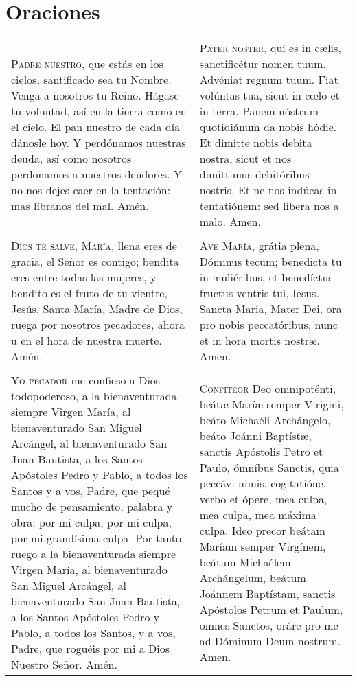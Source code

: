 \documentclass[./rosary.tex]{subfiles}
\begin{document}
\chapter*{Oraciones}

\begin{longtable} { p{} p{} }
    \label{ourFather}
    \textsc{Padre nuestro}, que estás en los cielos, santificado sea tu Nombre. Venga a nosotros tu Reino.
    Hágase tu voluntad, así en la tierra como en el cielo. El pan nuestro de cada día dánosle hoy.
    Y perdónamos nuestras deuda, así como nosotros perdonamos a nuestros deudores.
    Y no nos dejes caer en la tentación: mas líbranos del mal. Amén.
        &
    \textsc{Pater noster}, qui es in cælis, sanctificétur nomen tuum. Advéniat regnum tuum.
    Fiat volúntas tua, sicut in cœlo et in terra. Panem nóstrum quotidiánum da nobis hódie.
    Et dimitte nobis debita nostra, sicut et nos dimittimus debitóribus nostris.
    Et ne nos indúcas in tentatiónem: sed libera nos a malo. Amen.\\\\

    \label{hailMary}
    \textsc{Dios te salve, María}, llena eres de gracia, el Señor es contigo; bendita eres entre todas las mujeres,
    y bendito es el fruto de tu vientre, Jesús. Santa María, Madre de Dios, ruega por nosotros pecadores,
    ahora u en el hora de nuestra muerte. Amén.
        &
    \textsc{Ave María}, grátia plena, Dóminus tecum; benedicta tu in muliéribus, et benedíctus fructus ventris tui,
    Iesus. Sancta Maria, Mater Dei, ora pro nobis peccatóribus, nunc et in hora mortis nostræ. Amen.\\\\

    \label{iConfess}
    \textsc{Yo pecador} me confieso a Dios todopoderoso, a la bienaventurada siempre Virgen María, al bienaventurado San Miguel Arcángel,
    al bienaventurado San Juan Bautista, a los Santos Apóstoles Pedro y Pablo, a todos los Santos y a vos, Padre, que pequé mucho
    de pensamiento, palabra y obra: por mi culpa, por mi culpa, por mi grandísima culpa. Por tanto, ruego a la bienaventurada
    siempre Virgen María, al bienaventurado San Miguel Arcángel, al bienaventurado San Juan Bautista, a los Santos Apóstoles
    Pedro y Pablo, a todos los Santos, y a vos, Padre, que roguéis por mi a Dios Nuestro Señor. Amén.
    
        &

    \textsc{Confíteor} Deo omnipoténti, beátæ Maríæ semper Virigini, beáto Michaéli Archángelo, beáto Joánni Baptístæ, sanctis Apóstolis Petro et Paulo,
    ómníbus Sanctis, quia peccávi nimis, cogitatióne, verbo et ópere, mea culpa, mea culpa, mea máxima culpa. Ideo precor beátam
    Maríam semper Virgínem, beátum Michaélem Archángelum, beátum Joánnem Baptístam, sanctis Apóstolos Petrum et Paulum, omnes Sanctos,
    oráre pro me ad Dóminum Deum nostrum. Amen.
\end{longtable}
\end{document}
